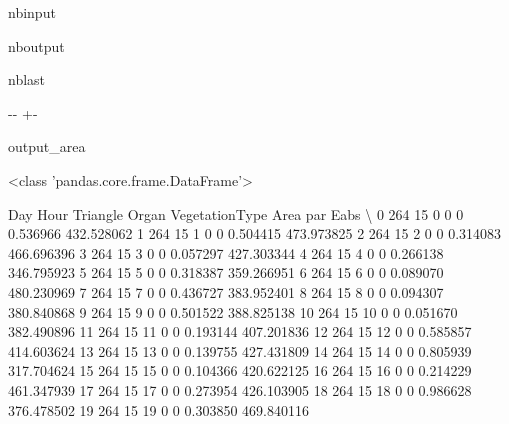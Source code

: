 \documentclass[letterpaper,10pt,english]{sphinxmanual}
\begin{document}
\begin{sphinxuseclass}{nbinput}
{
\begin{sphinxVerbatim}[commandchars=\\\{\}]
\llap{\color{nbsphinxin}[4]:\,\hspace{\fboxrule}\hspace{\fboxsep}}
\end{sphinxVerbatim}
}

\end{sphinxuseclass}
\begin{sphinxuseclass}{nboutput}
\begin{sphinxuseclass}{nblast}
{

\kern-\sphinxverbatimsmallskipamount\kern-\baselineskip
\kern+\FrameHeightAdjust\kern-\fboxrule
\vspace{\nbsphinxcodecellspacing}

\begin{sphinxuseclass}{output_area}
\begin{sphinxuseclass}{}


\begin{sphinxVerbatim}[commandchars=\\\{\}]
<class 'pandas.core.frame.DataFrame'>

    Day  Hour  Triangle  Organ  VegetationType      Area    par Eabs  \textbackslash{}
0   264    15         0      0               0  0.536966  432.528062
1   264    15         1      0               0  0.504415  473.973825
2   264    15         2      0               0  0.314083  466.696396
3   264    15         3      0               0  0.057297  427.303344
4   264    15         4      0               0  0.266138  346.795923
5   264    15         5      0               0  0.318387  359.266951
6   264    15         6      0               0  0.089070  480.230969
7   264    15         7      0               0  0.436727  383.952401
8   264    15         8      0               0  0.094307  380.840868
9   264    15         9      0               0  0.501522  388.825138
10  264    15        10      0               0  0.051670  382.490896
11  264    15        11      0               0  0.193144  407.201836
12  264    15        12      0               0  0.585857  414.603624
13  264    15        13      0               0  0.139755  427.431809
14  264    15        14      0               0  0.805939  317.704624
15  264    15        15      0               0  0.104366  420.622125
16  264    15        16      0               0  0.214229  461.347939
17  264    15        17      0               0  0.273954  426.103905
18  264    15        18      0               0  0.986628  376.478502
19  264    15        19      0               0  0.303850  469.840116


\end{sphinxVerbatim}
\end{sphinxuseclass}
\end{sphinxuseclass}}
\end{sphinxuseclass}
\end{sphinxuseclass}
\end{document}
